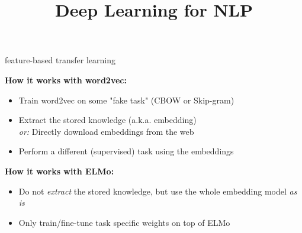 \documentclass[11pt,compress,t,notes=noshow, xcolor=table]{beamer}
\title{Deep Learning for NLP}
\begin{document}


\begin{frame}{feature-based transfer learning}

\vfill

	\textbf{How it works with word2vec:}
	
	\begin{itemize}
		\item Train word2vec on some "fake task" (CBOW or Skip-gram)
		\item Extract the stored knowledge (a.k.a. embedding)\\
					\textit{or:} Directly download embeddings from the web 
		\item Perform a different (supervised) task using the embeddings
	\end{itemize}
	
	\vspace{.3cm}
	
	\textbf{How it works with ELMo:}
	
	\begin{itemize}
		\item Do not \textit{extract} the stored knowledge, but use the whole embedding model \textit{as is}
		\item Only train/fine-tune task specific weights on top of ELMo
	\end{itemize}
	
\vfill

\end{frame}

\end{document}
